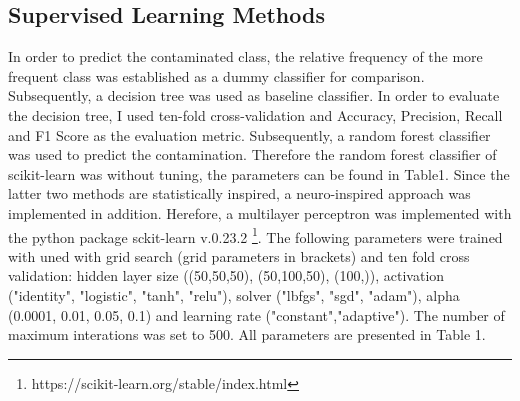 \documentclass{svproc}
\begin{document}
\subsection{Supervised Learning Methods}
In order to predict the contaminated class, the relative frequency of the more frequent class was established as a dummy classifier for comparison. Subsequently, a decision tree was used as baseline classifier. In order to evaluate the decision tree, I used ten-fold cross-validation and Accuracy, Precision, Recall and F1 Score as the evaluation metric.
Subsequently, a random forest classifier was used to predict the contamination. Therefore the random forest classifier of scikit-learn was without tuning, the parameters can be found in Table1. Since the latter two methods are statistically inspired, a neuro-inspired approach was implemented in addition. Herefore, a multilayer perceptron was implemented with the python package sckit-learn v.0.23.2 \footnote{https://scikit-learn.org/stable/index.html}. The following parameters  were trained with uned with grid search (grid parameters in brackets) and ten fold cross validation: hidden layer size ((50,50,50), (50,100,50), (100,)), activation ("identity", "logistic", "tanh", "relu"), solver ("lbfgs", "sgd", "adam"), alpha (0.0001, 0.01, 0.05, 0.1) and learning rate ("constant","adaptive"). The number of maximum interations was set to 500. All parameters are presented in Table 1.
\end{document}

